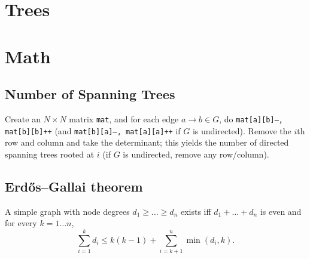 

\section{Trees}

\section{Math}
	\subsection{Number of Spanning Trees}
		Create an $N\times N$ matrix \texttt{mat}, and for each edge $a \rightarrow b \in G$, do
		\texttt{mat[a][b]--, mat[b][b]++} (and \texttt{mat[b][a]--, mat[a][a]++} if $G$ is undirected).
		Remove the $i$th row and column and take the determinant; this yields the number of directed spanning trees rooted at $i$
		(if $G$ is undirected, remove any row/column).

	\subsection{Erdős–Gallai theorem}
		A simple graph with node degrees $d_1 \ge \dots \ge d_n$ exists iff $d_1 + \dots + d_n$ is even and for every $k = 1\dots n$,
		\[ \sum _{i=1}^{k}d_{i}\leq k(k-1)+\sum _{i=k+1}^{n}\min(d_{i},k). \]
